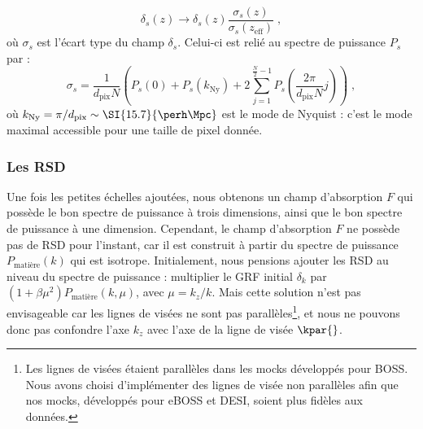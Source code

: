   \begin{equation}
    \delta_s(z) \rightarrow \delta_s(z) \frac{\sigma_s(z)}{\sigma_s(z_{\mathrm{eff}})} \; ,
  \end{equation}
  où $\sigma_s$ est l'écart type du champ $\delta_s$. Celui-ci est relié au spectre de puissance $P_{s}$ par :
  \begin{equation}
    \label{eq:sigma_s}
    \sigma_s = \frac{1}{d_{\mathrm{pix}}N} \left( P_{s}(0) + P_{s}(k_{\mathrm{Ny}}) + 2 \sum_{j=1}^{\frac{N}{2} - 1}P_{s}\left(\frac{2 \pi}{d_{\mathrm{pix}}N} j\right)\right) \; ,
  \end{equation}
  où $k_{\mathrm{Ny}} = \pi / d_{\mathrm{pix}} \sim \SI{15.7}{\perh\Mpc}$ est le mode de Nyquist : c'est le mode maximal accessible pour une taille de pixel donnée.


\subsubsection{Les RSD}
\label{subsubsec:rsdlya}
Une fois les petites échelles ajoutées, nous obtenons un champ d'absorption $F$ qui possède le bon spectre de puissance à trois dimensions, ainsi que le bon spectre de puissance à une dimension.
Cependant, le champ d'absorption $F$ ne possède pas de RSD pour l'instant, car il est construit à partir du spectre de puissance $P_{\mathrm{matière}}(k)$ qui est isotrope.
Initialement, nous pensions ajouter les RSD au niveau du spectre de puissance : multiplier le GRF initial $\delta_k$ par $(1 + \beta \mu^2)P_{\mathrm{matière}}(k, \mu)$, avec $\mu = k_z / k$.
Mais cette solution n'est pas envisageable car les lignes de visées ne sont pas parallèles\footnote{Les lignes de visées étaient parallèles dans les mocks développés pour BOSS. Nous avons choisi d'implémenter des lignes de visée non parallèles afin que nos mocks, développés pour eBOSS et DESI, soient plus fidèles aux données.}, et nous ne pouvons donc pas confondre l'axe $k_z$ avec l'axe de la ligne de visée $\kpar{}$.
